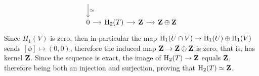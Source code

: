 \begin{example}[Torus]
\begin{enumerate}[(a)]
\[\begin{tikzcd}[column sep=small]
                      \ar[d, "\dis"]
                      \\
                      0
                      \ar[r]
                      &\Hmlg_2(T)
                      \ar[r]
                      &\Z
                      \ar[r]
                      &\Z \oplus \Z
                  \end{tikzcd}
              \]
              Since \(H_1(V)\) is zero, then in particular the map
              \(\operatorname{H}_1(U \cap V) \to \operatorname{H}_1(U) \oplus \operatorname{H}_1(V)\) sends
              \([\phi] \mapsto (0, 0)\), therefore the induced map \(\mathbf{Z} \to \mathbf{Z} \oplus \mathbf{Z}\) is zero, that is,
              has kernel \(\mathbf{Z}\). Since the sequence is exact, the image of
              \(\operatorname{H}_2(T) \to \mathbf{Z}\) equals \(\mathbf{Z}\), therefore being both an injection and
              surjection, proving that \(\operatorname{H}_2(T) \simeq \mathbf{Z}\).


\end{enumerate}
\end{example}
